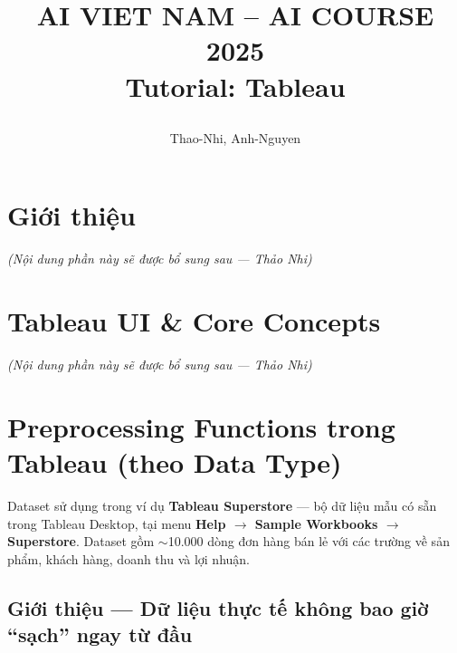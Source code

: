 \documentclass[12pt]{article}
\title{%
  \begin{center}
        \Large {AI VIET NAM -- AI COURSE 2025}\\[.5ex]  
        \Huge \textbf{Tutorial: Tableau}\\[.5ex]
  \end{center}
}
\author{
        \begin{minipage}{\textwidth}
        \centering
        {
          Thao-Nhi,\quad
          Anh-Nguyen
        }\\
      \end{minipage}
    }
\date{}
\begin{document}
\maketitle
\vspace{-3.5em}

\section{Giới thiệu}
\label{section:intro}

\textit{(Nội dung phần này sẽ được bổ sung sau — Thảo Nhi)}

\newpage
\setcounter{tocdepth}{2}
\tableofcontents
\thispagestyle{fancy}

\newpage
\section{Tableau UI \& Core Concepts}
\label{section:ui}

\textit{(Nội dung phần này sẽ được bổ sung sau — Thảo Nhi)}


\newpage
\section{Preprocessing Functions trong Tableau (theo Data Type)}
\label{section:preprocessing}




\begin{conceptbox}{Dataset sử dụng trong ví dụ}
\textbf{Tableau Superstore} --- bộ dữ liệu mẫu có sẵn trong Tableau Desktop, tại menu \textbf{Help $\rightarrow$ Sample Workbooks $\rightarrow$ Superstore}. Dataset gồm $\sim$10.000 dòng đơn hàng bán lẻ với các trường về sản phẩm, khách hàng, doanh thu và lợi nhuận.
\end{conceptbox}


\subsection{Giới thiệu --- Dữ liệu thực tế không bao giờ ``sạch'' ngay từ đầu}
\end{document}
